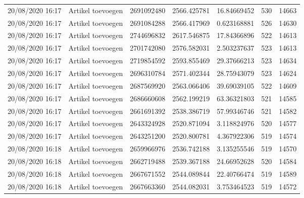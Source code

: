 \begin{tiny}
\begin{longtable}{lllllll}
    20/08/2020 16:17 & Artikel toevoegen     & 2691092480        & 2566.425781 & 16.84669452           & 530              & 14663            \\
    20/08/2020 16:17 & Artikel toevoegen     & 2691084288        & 2566.417969 & 0.623168881           & 526              & 14630            \\
    20/08/2020 16:17 & Artikel toevoegen     & 2744696832        & 2617.546875 & 17.84366896           & 522              & 14613            \\
    20/08/2020 16:17 & Artikel toevoegen     & 2701742080        & 2576.582031 & 2.503237637           & 523              & 14613            \\
    20/08/2020 16:17 & Artikel toevoegen     & 2719854592        & 2593.855469 & 29.37666213           & 523              & 14634            \\
    20/08/2020 16:17 & Artikel toevoegen     & 2696310784        & 2571.402344 & 28.75943079           & 523              & 14624            \\
    20/08/2020 16:17 & Artikel toevoegen     & 2687569920        & 2563.066406 & 39.69039105           & 522              & 14609            \\
    20/08/2020 16:17 & Artikel toevoegen     & 2686660608        & 2562.199219 & 63.36321803           & 521              & 14585            \\
    20/08/2020 16:17 & Artikel toevoegen     & 2661691392        & 2538.386719 & 57.99346746           & 521              & 14582            \\
    20/08/2020 16:17 & Artikel toevoegen     & 2643324928        & 2520.871094 & 3.118824976           & 520              & 14577            \\
    20/08/2020 16:17 & Artikel toevoegen     & 2643251200        & 2520.800781 & 4.367922306           & 519              & 14574            \\
    20/08/2020 16:18 & Artikel toevoegen     & 2659966976        & 2536.742188 & 3.135255546           & 519              & 14570            \\
    20/08/2020 16:18 & Artikel toevoegen     & 2662719488        & 2539.367188 & 24.66952628           & 520              & 14584            \\
    20/08/2020 16:18 & Artikel toevoegen     & 2667671552        & 2544.089844 & 22.40766474           & 519              & 14589            \\
    20/08/2020 16:18 & Artikel toevoegen     & 2667663360        & 2544.082031 & 3.753464523           & 519              & 14572            \\

\end{longtable}
\end{tiny}
